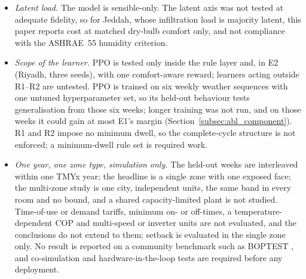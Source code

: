 \documentclass[pdflatex,sn-mathphys-num,iicol]{sn-jnl}
\theoremstyle{thmstyleone}\newtheorem{proposition}{Proposition}\newtheorem{corollary}{Corollary}
\theoremstyle{thmstyletwo}\newtheorem{remark}{Remark}\newtheorem{observation}{Observation}
\theoremstyle{thmstylethree}\newtheorem{definition}{Definition}
\begin{document}
\begin{itemize}[leftmargin=*,itemsep=1pt,topsep=2pt]
between arms: along the guard family a $0.01\,$K warmer mean is worth about $1.3$ points, so the $3$-point resolution rule corresponds to about $0.02\,$K, below Rule~A's $0.03\,$K tolerance. Arms whose $\Delta\tilde T$ differs by more than about $0.02\,$K, including those fitted at the $0.10\,$K fallback, are compared with that caveat. The admission rule itself matters: refitting under a per-window $0.03\,$K criterion moves TUNED by up to $8.4$ points and reverses F4 in Taif (Supplementary Table~S2); the MPC arms were not refitted under it, so the robustness of F2 and F3 to the admission rule is untested. Where the $\lambda$ device cannot reach the matched comfort level, MPC is matched by backing off its occupied ceiling, and a negative saving there is a finding about the device, not a failure of the protocol.
\item \emph{Latent load.} The model is sensible-only. The latent axis was not
tested at adequate fidelity, so for Jeddah, whose infiltration load is majority latent, this paper reports cost at matched dry-bulb comfort only, and not compliance with the ASHRAE~55 humidity criterion.
\item \emph{Scope of the learner.} PPO is tested only inside the rule layer and,
in E2 (Riyadh, three seeds), with one comfort-aware reward; learners acting outside R1--R2 are untested. PPO is trained on six weekly weather sequences with one untuned hyperparameter set, so its held-out behaviour tests generalisation from those six weeks; longer training was not run, and on those weeks it could gain at most E1's margin (Section~\ref{subsec:abl_component}). R1 and R2 impose no minimum dwell, so the complete-cycle structure is not enforced; a minimum-dwell rule set is required work.
\item \emph{One year, one zone type, simulation only.} The held-out weeks are
interleaved within one TMYx year; the headline is a single zone with one exposed face; the multi-zone study is one city, independent units, the same band in every room and no bound, and a shared capacity-limited plant is not studied. Time-of-use or demand tariffs, minimum on- or off-times, a temperature-dependent COP and multi-speed or inverter units are not evaluated, and the conclusions do not extend to them; setback is evaluated in the single zone only. No result is reported on a community benchmark such as BOPTEST \citep{Blum2021}, and co-simulation and hardware-in-the-loop tests are required before any deployment.
\end{itemize}
\end{document}

